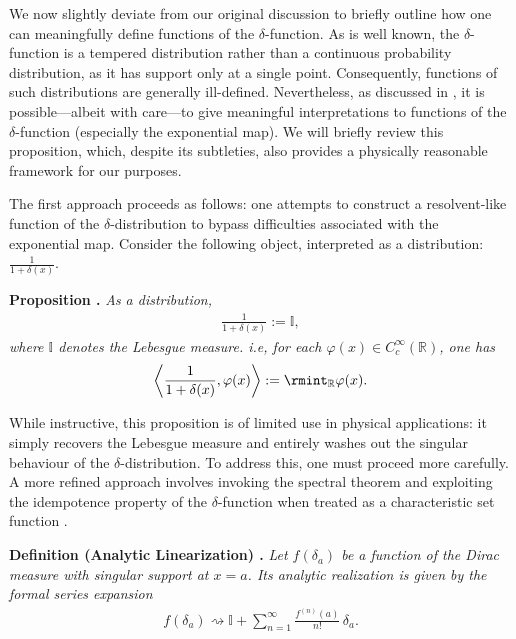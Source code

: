 \begin{tcolorbox}[thesisstatementbox, title=A digression on the functions of Dirac-$\delta$ function (measure)]
\restorethesisbodyformat
We now slightly deviate from our original discussion to briefly outline how one can meaningfully define functions of the \(\delta\)-function. As is well known, the \(\delta\)-function is a tempered distribution rather than a continuous probability distribution, as it has support only at a single point. Consequently, functions of such distributions are generally ill-defined. Nevertheless, as discussed in \cite{maroun2013generalized}, it is possible---albeit with care---to give meaningful interpretations to functions of the \(\delta\)-function (especially the exponential map). We will briefly review this proposition, which, despite its subtleties, also provides a physically reasonable framework for our purposes. \par

The first approach proceeds as follows: one attempts to construct a resolvent-like function of the \(\delta\)-distribution to bypass difficulties associated with the exponential map. Consider the following object, interpreted as a distribution: $\frac{1}{1+\delta(x)}$.

\textbf{Proposition \cite{maroun2013generalized,johnson2000feynman}.} \textit{As a distribution,}
\begin{align}
    \frac{1}{1+\delta(x)} := \mathbb{I},
\end{align}
\textit{where \(\mathbb{I}\) denotes the Lebesgue measure. i.e, for each \(\varphi(x) \in C^{\infty}_c(\mathbb{R})\), one has}
\begin{align}
    \left\langle \frac{1}{1+\delta(x)}, \varphi(x) \right\rangle := \rmint_{\mathbb{R}} \varphi(x).
\end{align}

While instructive, this proposition is of limited use in physical applications: it simply recovers the Lebesgue measure and entirely washes out the singular behaviour of the \(\delta\)-distribution. To address this, one must proceed more carefully. A more refined approach involves invoking the spectral theorem and exploiting the idempotence property of the \(\delta\)-function when treated as a characteristic set function \cite{maroun2013generalized}.

\textbf{Definition (Analytic Linearization) \cite{maroun2013generalized}.} 
\textit{Let \(f(\delta_a)\) be a function of the Dirac measure with singular support at \(x = a\). Its analytic realization is given by the formal series expansion}
\begin{align}
    f(\delta_a) \rightsquigarrow \mathbb{I} + \sum_{n=1}^\infty \frac{f^{(n)}(a)}{n!}\, \delta_a.\label{3.18j}
\end{align}


\end{tcolorbox}
